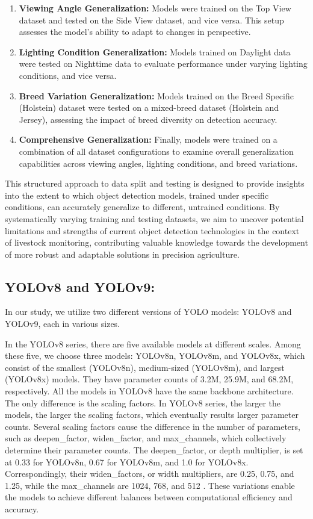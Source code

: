 \begin{enumerate}
 \item\textbf{Viewing Angle Generalization:} Models were trained on the Top View dataset and tested on the Side View dataset, and vice versa. This setup assesses the model's ability to adapt to changes in perspective.
 \item\textbf{Lighting Condition Generalization:} Models trained on Daylight data were tested on Nighttime data to evaluate performance under varying lighting conditions, and vice versa.
\item\textbf{Breed Variation Generalization:} Models trained on the Breed Specific (Holstein) dataset were tested on a mixed-breed dataset (Holstein and Jersey), assessing the impact of breed diversity on detection accuracy.
 \item\textbf{Comprehensive Generalization:} Finally, models were trained on a combination of all dataset configurations to examine overall generalization capabilities across viewing angles, lighting conditions, and breed variations.
 \end{enumerate}
This structured approach to data split and testing is designed to provide insights into the extent to which object detection models, trained under specific conditions, can accurately generalize to different, untrained conditions. By systematically varying training and testing datasets, we aim to uncover potential limitations and strengths of current object detection technologies in the context of livestock monitoring, contributing valuable knowledge towards the development of more robust and adaptable solutions in precision agriculture.



\subsection{YOLOv8 and YOLOv9:}

In our study, we utilize two different versions of YOLO models: YOLOv8 and YOLOv9, each in various sizes.

In the YOLOv8 series, there are five available models at different scales. Among these five, we choose three models: YOLOv8n, YOLOv8m, and YOLOv8x, which consist of the smallest (YOLOv8n), medium-sized (YOLOv8m), and largest (YOLOv8x) models. They have parameter counts of 3.2M, 25.9M, and 68.2M, respectively. All the models in YOLOv8 have the same backbone architecture. The only difference is the scaling factors. In YOLOv8 series, the larger the models, the larger the scaling factors, which eventually results larger parameter counts. Several scaling factors cause the difference in the number of parameters, such as deepen\_factor, widen\_factor, and max\_channels, which collectively determine their parameter counts. The deepen\_factor, or depth multiplier, is set at 0.33 for YOLOv8n, 0.67 for YOLOv8m, and 1.0 for YOLOv8x. Correspondingly, their widen\_factors, or width multipliers, are 0.25, 0.75, and 1.25, while the max\_channels are 1024, 768, and 512 \cite{v8yaml}. These variations enable the models to achieve different balances between computational efficiency and accuracy.

